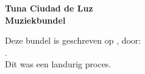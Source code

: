 \begin{titlepage}
\begin{center}
\textbf{\Huge Tuna Ciudad de Luz \\Muziekbundel}
\vfill
\end{center}
\makeatletter
Deze bundel is geschreven op \@date, door:\\
\@author.\\
Dit was een landurig proces.
\makeatother
\end{titlepage}
